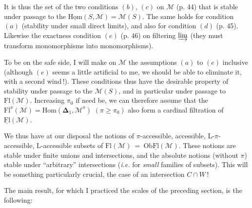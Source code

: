 \documentclass[11pt]{article}
\newcommand{\printedpage}[1]{\marginpar{\footnotesize p.~#1}}
\newcommand{\msp}[1]{\marginpar{\footnotesize [#1]}}
\newcommand{\Fl}{\mathrm{Fl}}
\newcommand{\Ob}{\mathrm{Ob}}
\newcommand{\uHom}{\underline{\mathrm{Hom}}}
\newcommand{\uFl}{\underline{\mathrm{Fl}}}
\begin{document}
It is thus the set of the two conditions $(b)$, $(c)$ on $\mathcal{M}$ (p. 44) that is stable under passage to the $\uHom(S,\mathcal{M}) = \mathcal{M}(S)$. The same holds for condition $(a)$ (stability under small direct limits), and also for condition\msp{page 75}
$(d)$ (p. 45). Likewise the exactness condition $(e)$ (p. 46) on filtering $\varinjlim$ (they must transform monomorphisms into monomorphisms).

To be on the safe side, I will make on $\mathcal{M}$ the assumptions $(a)$ to $(e)$ inclusive (although $(e)$ seems a little artificial to me, we should be able to eliminate it, with a second wind\,!). These conditions thus have the desirable property of stability under passage to the $\mathcal{M}(S)$, and in particular under passage to $\Fl(\mathcal{M})$. Increasing $\pi_{0}$ if need be, we can therefore assume that the $\Fl^{\pi}(\mathcal{M}) = \mathrm{Hom}(\boldsymbol{\Delta}_{1},\mathcal{M}^{\pi})$ $(\pi \geq \pi_{0})$ also form a cardinal filtration of $\uFl(\mathcal{M})$.

We thus have at our disposal the notions of $\pi$-accessible, accessible, L-$\pi$-accessible, L-accessible subsets of $\Fl(\mathcal{M}) \ = \ \Ob\uFl(\mathcal{M})$. These notions are stable under finite unions and intersections, and the absolute notions (without $\pi$) stable under ``arbitrary'' intersections (\textit{i.e.} for \textit{small} families of subsets). This will be something particularly\printedpage{42}%
\msp{page 76}
crucial, the case of an intersection $C \cap W$\,!

The main result, for which I practiced the scales of the preceding section, is the following:
\end{document}
